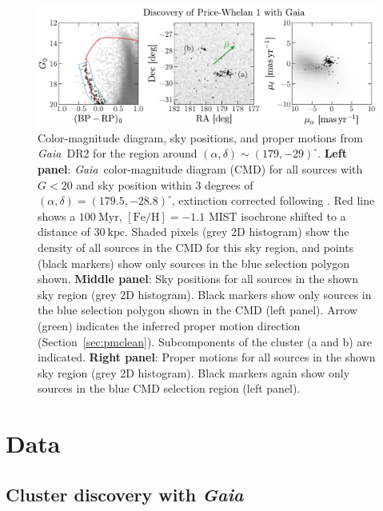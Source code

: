 \documentclass[twocolumn]{aastex62}
\newcommand{\acronym}[1]{{\small{#1}}}
\newcommand{\gaia}{\textsl{Gaia}}
\newcommand{\DR}[1]{\acronym{DR#1}}
\newcommand{\sectionname}{Section}
\newcommand{\kpc}{\textrm{kpc}}
\newcommand{\feh}{\ensuremath{[\textrm{Fe} / \textrm{H}]}}
\begin{document}
\begin{figure}[t!]
\centering
\includegraphics[width=\textwidth]{figures/gaia-cmd-pm.pdf}
\caption{Color-magnitude diagram, sky positions, and proper motions from \gaia\ \DR{2} for the region around $(\alpha, \delta) \sim (179, -29)^\circ$.
\textbf{Left panel}: \gaia\ color-magnitude diagram (CMD) for all sources with $G < 20$ and sky position within 3 degrees of $(\alpha, \delta) = (179.5, -28.8)^\circ$, extinction corrected following \citet{Danielski:2018}.
Red line shows a $100~\textrm{Myr}$, $\feh = -1.1$ \acronym{MIST} isochrone shifted to a distance of $30~\kpc$.
Shaded pixels (grey 2D histogram) show the density of all sources in the CMD for this sky region, and points (black markers) show only sources in the blue selection polygon shown.
\textbf{Middle panel}: Sky positions for all sources in the shown sky region (grey 2D histogram).
Black markers show only sources in the blue selection polygon shown in the CMD (left panel).
Arrow (green) indicates the inferred proper motion direction (\sectionname~\ref{sec:pmclean}).
Subcomponents of the cluster (a and b) are indicated.
\textbf{Right panel}: Proper motions for all sources in the shown sky region (grey 2D histogram).
Black markers again show only sources in the blue CMD selection region (left panel).
}
\label{fig:cmds}
\end{figure}

\section{Data} \label{sec:data}

\subsection{Cluster discovery with \gaia}
\label{sec:discovery}
\end{document}
